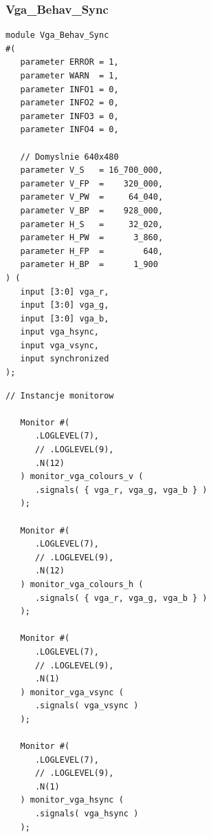 \documentclass[a4paper,12pt]{article}
\begin{document}
\subsubsection{Vga\_Behav\_Sync}

\begin{lstlisting}[label=Syncvga,caption=Sync.v,firstnumber=56]
module Vga_Behav_Sync
#(
   parameter ERROR = 1,
   parameter WARN  = 1,
   parameter INFO1 = 0,
   parameter INFO2 = 0,
   parameter INFO3 = 0,
   parameter INFO4 = 0,

   // Domyslnie 640x480
   parameter V_S   = 16_700_000,
   parameter V_FP  =    320_000,
   parameter V_PW  =     64_040,
   parameter V_BP  =    928_000,
   parameter H_S   =     32_020,
   parameter H_PW  =      3_860,
   parameter H_FP  =        640,
   parameter H_BP  =      1_900
) (
   input [3:0] vga_r,
   input [3:0] vga_g,
   input [3:0] vga_b,
   input vga_hsync,
   input vga_vsync,
   input synchronized
);
\end{lstlisting}

\begin{lstlisting}[label=Syncvga,caption=Sync.v,firstnumber=56]
   // Instancje monitorow

   Monitor #(
      .LOGLEVEL(7),
      // .LOGLEVEL(9),
      .N(12)
   ) monitor_vga_colours_v (
      .signals( { vga_r, vga_g, vga_b } )
   );

   Monitor #(
      .LOGLEVEL(7),
      // .LOGLEVEL(9),
      .N(12)
   ) monitor_vga_colours_h (
      .signals( { vga_r, vga_g, vga_b } )
   );

   Monitor #(
      .LOGLEVEL(7),
      // .LOGLEVEL(9),
      .N(1)
   ) monitor_vga_vsync (
      .signals( vga_vsync )
   );

   Monitor #(
      .LOGLEVEL(7),
      // .LOGLEVEL(9),
      .N(1)
   ) monitor_vga_hsync (
      .signals( vga_hsync )
   );
\end{lstlisting}
\end{document}
